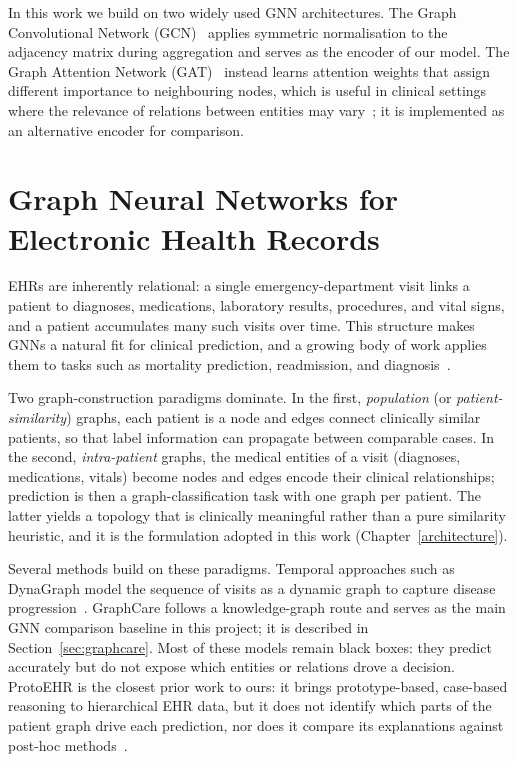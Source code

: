In this work we build on two widely used GNN architectures. The Graph
Convolutional Network (GCN)~\cite{kipf2017gcn} applies symmetric normalisation
to the adjacency matrix during aggregation and serves as the encoder of our
model. The Graph Attention Network (GAT)~\cite{velickovic2018gat} instead
learns attention weights that assign different importance to neighbouring
nodes, which is useful in clinical settings where the relevance of relations
between entities may vary~\cite{ossboll2024gnn}; it is implemented as an
alternative encoder for comparison.

\section{Graph Neural Networks for Electronic Health Records}
\label{sec:gnn-ehr}

EHRs are inherently relational: a single emergency-department visit links a
patient to diagnoses, medications, laboratory results, procedures, and vital
signs, and a patient accumulates many such visits over time. This structure
makes GNNs a natural fit for clinical prediction, and a growing body of work
applies them to tasks such as mortality prediction, readmission, and
diagnosis~\cite{ossboll2024gnn}.

Two graph-construction paradigms dominate. In the first, \emph{population} (or
\emph{patient-similarity}) graphs, each patient is a node and edges connect
clinically similar patients, so that label information can propagate between
comparable cases. In the second, \emph{intra-patient} graphs, the medical
entities of a visit (diagnoses, medications, vitals) become nodes and edges
encode their clinical relationships; prediction is then a graph-classification
task with one graph per patient. The latter yields a topology that is
clinically meaningful rather than a pure similarity heuristic, and it is the
formulation adopted in this work (Chapter~\ref{architecture}).

Several methods build on these paradigms. Temporal approaches such as DynaGraph
model the sequence of visits as a dynamic graph to capture disease
progression~\cite{mesinovic2026dynagraph}. GraphCare follows a knowledge-graph
route and serves as the main GNN comparison baseline in this project; it is
described in Section~\ref{sec:graphcare}. Most of these models remain black
boxes: they predict accurately but do not expose which entities or relations
drove a decision. ProtoEHR is the closest prior work to ours: it brings
prototype-based, case-based reasoning to hierarchical EHR data, but it does not
identify which parts of the patient graph drive each prediction, nor does it
compare its explanations against post-hoc methods~\cite{cai2025protoehr}.

